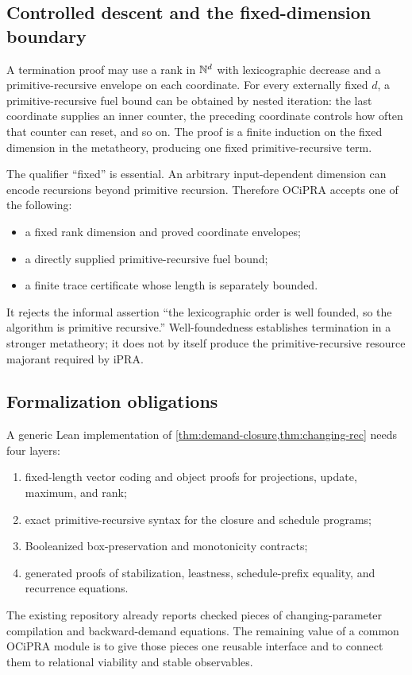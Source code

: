 \subsection{Controlled descent and the fixed-dimension boundary}

A termination proof may use a rank in $\mathbb N^d$ with lexicographic decrease and a primitive-recursive envelope on each coordinate.  For every externally fixed $d$, a primitive-recursive fuel bound can be obtained by nested iteration: the last coordinate supplies an inner counter, the preceding coordinate controls how often that counter can reset, and so on.  The proof is a finite induction on the fixed dimension in the metatheory, producing one fixed primitive-recursive term.

The qualifier ``fixed'' is essential.  An arbitrary input-dependent dimension can encode recursions beyond primitive recursion.  Therefore OCiPRA accepts one of the following:

\begin{itemize}
  \item a fixed rank dimension and proved coordinate envelopes;
  \item a directly supplied primitive-recursive fuel bound;
  \item a finite trace certificate whose length is separately bounded.
\end{itemize}

It rejects the informal assertion ``the lexicographic order is well founded, so the algorithm is primitive recursive.''  Well-foundedness establishes termination in a stronger metatheory; it does not by itself produce the primitive-recursive resource majorant required by iPRA.

\subsection{Formalization obligations}

A generic Lean implementation of \cref{thm:demand-closure,thm:changing-rec} needs four layers:

\begin{enumerate}
  \item fixed-length vector coding and object proofs for projections, update, maximum, and rank;
  \item exact primitive-recursive syntax for the closure and schedule programs;
  \item Booleanized box-preservation and monotonicity contracts;
  \item generated  proofs of stabilization, leastness, schedule-prefix equality, and recurrence equations.
\end{enumerate}

The existing repository already reports checked pieces of changing-parameter compilation and backward-demand equations.  The remaining value of a common OCiPRA module is to give those pieces one reusable interface and to connect them to relational viability and stable observables.
